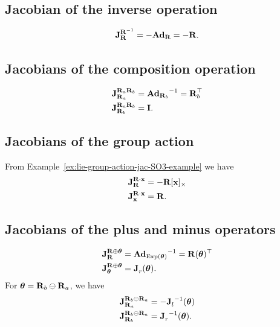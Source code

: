 \subsection{Jacobian of the inverse operation}
\begin{equation}
  \jac{\matR^{-1}}{\matR} = -\mAd_\matR = -\matR.
\end{equation}

\subsection{Jacobians of the composition operation}
\begin{align}
  \jac{\matR_a \matR_b}{\matR_a} &= {\mAd_{\matR_b}}^{-1} = \matR_b\trans\\
  \jac{\matR_a \matR_b}{\matR_b} &= \matI.
\end{align}

\subsection{Jacobians of the group action}
From Example~\ref{ex:lie-group-action-jac-SO3-example} we have
\begin{align}
  \jac{\matR \cdot \vecx}{\matR} &= -\matR [\vecx]_\times\\
  \jac{\matR \cdot \vecx}{\vecx} &= \matR.
\end{align}

\subsection{Jacobians of the plus and minus operators}
\begin{align}
  \jac{\matR \oplus \vectheta}{\matR} &= {\mAd_{\Exp(\vectheta)}}^{-1} = \matR(\vectheta)\trans\\
  \jac{\matR \oplus \vectheta}{\vectheta} &= \jac{}{r}(\vectheta).
\end{align}
For $\vectheta = \matR_b \ominus \matR_a$, we have
\begin{align}
  \jac{\matR_b \ominus \matR_a}{\matR_a} &= -\jac{}{l}^{-1}(\vectheta)\\
  \jac{\matR_b \ominus \matR_a}{\matR_b} &= \jac{}{r}^{-1}(\vectheta).
\end{align}

